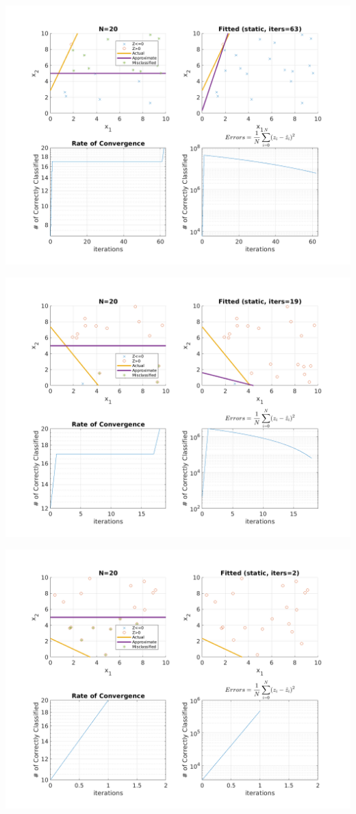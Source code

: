 \documentclass{article}
\newenvironment{Figure}
  {\par\medskip\noindent\minipage{\linewidth}}
  {\endminipage\par\medskip}
\begin{document}
\begin{multicols}{2}
\noindent
\begin{Figure}
\centering
\includegraphics[width=\linewidth]{pngs/n20_static1.png}
\end{Figure}
\begin{Figure}
\centering
\includegraphics[width=\linewidth]{pngs/n20_static2.png}
\end{Figure}
\begin{Figure}
\centering
\includegraphics[width=\linewidth]{pngs/n20_static3.png}

\end{Figure}
\end{multicols}
\end{document}
